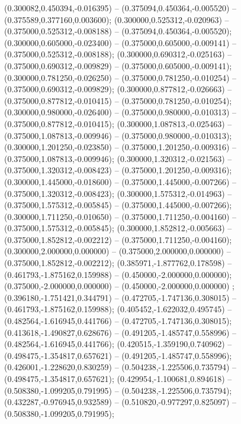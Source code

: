  (0.300082,0.450394,-0.016395) -- (0.375094,0.450364,-0.005520) -- (0.375589,0.377160,0.003600);
 (0.300000,0.525312,-0.020963) -- (0.375000,0.525312,-0.008188) -- (0.375094,0.450364,-0.005520);
 (0.300000,0.605000,-0.023400) -- (0.375000,0.605000,-0.009141) -- (0.375000,0.525312,-0.008188);
 (0.300000,0.690312,-0.025163) -- (0.375000,0.690312,-0.009829) -- (0.375000,0.605000,-0.009141);
 (0.300000,0.781250,-0.026250) -- (0.375000,0.781250,-0.010254) -- (0.375000,0.690312,-0.009829);
 (0.300000,0.877812,-0.026663) -- (0.375000,0.877812,-0.010415) -- (0.375000,0.781250,-0.010254);
 (0.300000,0.980000,-0.026400) -- (0.375000,0.980000,-0.010313) -- (0.375000,0.877812,-0.010415);
 (0.300000,1.087813,-0.025463) -- (0.375000,1.087813,-0.009946) -- (0.375000,0.980000,-0.010313);
 (0.300000,1.201250,-0.023850) -- (0.375000,1.201250,-0.009316) -- (0.375000,1.087813,-0.009946);
 (0.300000,1.320312,-0.021563) -- (0.375000,1.320312,-0.008423) -- (0.375000,1.201250,-0.009316);
 (0.300000,1.445000,-0.018600) -- (0.375000,1.445000,-0.007266) -- (0.375000,1.320312,-0.008423);
 (0.300000,1.575312,-0.014963) -- (0.375000,1.575312,-0.005845) -- (0.375000,1.445000,-0.007266);
 (0.300000,1.711250,-0.010650) -- (0.375000,1.711250,-0.004160) -- (0.375000,1.575312,-0.005845);
 (0.300000,1.852812,-0.005663) -- (0.375000,1.852812,-0.002212) -- (0.375000,1.711250,-0.004160);
 (0.300000,2.000000,0.000000) -- (0.375000,2.000000,0.000000) -- (0.375000,1.852812,-0.002212);
 (0.385971,-1.877762,0.178598) -- (0.461793,-1.875162,0.159988) -- (0.450000,-2.000000,0.000000);
 (0.375000,-2.000000,0.000000) -- (0.450000,-2.000000,0.000000) ;
 (0.396180,-1.751421,0.344791) -- (0.472705,-1.747136,0.308015) -- (0.461793,-1.875162,0.159988);
 (0.405452,-1.622032,0.495745) -- (0.482564,-1.616945,0.441766) -- (0.472705,-1.747136,0.308015);
 (0.413618,-1.490827,0.628676) -- (0.491205,-1.485747,0.558996) -- (0.482564,-1.616945,0.441766);
 (0.420515,-1.359190,0.740962) -- (0.498475,-1.354817,0.657621) -- (0.491205,-1.485747,0.558996);
 (0.426001,-1.228620,0.830259) -- (0.504238,-1.225506,0.735794) -- (0.498475,-1.354817,0.657621);
 (0.429954,-1.100681,0.894618) -- (0.508380,-1.099205,0.791995) -- (0.504238,-1.225506,0.735794);
 (0.432287,-0.976945,0.932589) -- (0.510820,-0.977297,0.825097) -- (0.508380,-1.099205,0.791995);
